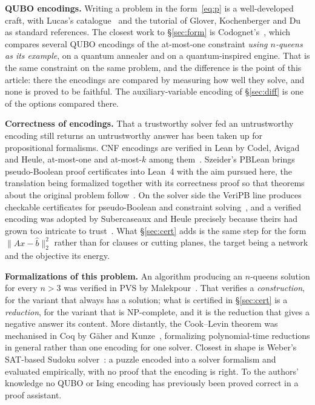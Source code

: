 \documentclass{easychair}
\newcommand{\secref}[1]{\hyperref[#1]{\textcolor{academicpurple}{\S\ref*{#1}}}}
\newcommand{\citeref}[1]{\textcolor{academicpurple}{\cite{#1}}}
\begin{document}
\medskip\noindent\textbf{QUBO encodings.} Writing a problem in the form~\eqref{eq:p} is a
well-developed craft, with Lucas's catalogue~\citeref{lucas2014ising} and the tutorial of Glover,
Kochenberger and Du~\citeref{glover2019} as standard references. The closest work to
\secref{sec:form} is Codognet's~\citeref{codognet2023}, which compares several QUBO encodings of the
at-most-one constraint \emph{using $n$-queens as its example}, on a quantum annealer and on a
quantum-inspired engine. That is the same constraint on the same problem, and the difference is the
point of this article: there the encodings are compared by measuring how well they solve, and none is
proved to be faithful. The auxiliary-variable encoding of \secref{sec:diff} is one of the options
compared there.

\medskip\noindent\textbf{Correctness of encodings.} That a trustworthy solver fed an untrustworthy
encoding still returns an untrustworthy answer has been taken up for propositional formalisms. CNF
encodings are verified in Lean by Codel, Avigad and Heule, at-most-one and at-most-$k$ among
them~\citeref{codel2023}. Szeider's PBLean brings pseudo-Boolean proof certificates into Lean~4 with
the aim pursued here, the translation being formalized together with its correctness proof so that
theorems about the original problem follow~\citeref{szeider2026}. On the solver side the VeriPB line
produces checkable certificates for pseudo-Boolean and constraint solving~\citeref{bogaerts2022}, and
a verified encoding was adopted by Subercaseaux and Heule precisely because theirs had grown too
intricate to trust~\citeref{subercaseaux2023}. What \secref{sec:cert} adds is the same step for the
form $\lVert \hat Ax - \hat b\rVert_2^2$ rather than for clauses or cutting planes, the target being a
network and the objective its energy.

\medskip\noindent\textbf{Formalizations of this problem.} An algorithm producing an $n$-queens
solution for every $n > 3$ was verified in PVS by Malekpour~\citeref{malekpour2020}. That verifies a
\emph{construction}, for the variant that always has a solution; what is certified in
\secref{sec:cert} is a \emph{reduction}, for the variant that is \textsf{NP}-complete, and it is the
reduction that gives a negative answer its content. More distantly, the Cook--Levin theorem was
mechanised in Coq by G\"{a}her and Kunze~\citeref{gaeher2021}, formalizing polynomial-time reductions in
general rather than one encoding for one solver. Closest in shape is Weber's SAT-based Sudoku
solver~\citeref{weber2006}: a puzzle encoded into a solver formalism and evaluated empirically, with
no proof that the encoding is right. To the authors' knowledge no QUBO or Ising encoding has
previously been proved correct in a proof assistant.
\end{document}

